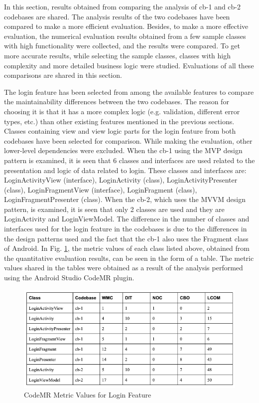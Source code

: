 In this section, results obtained from comparing the analysis of cb-1 and cb-2 codebases are shared. The analysis results of the two codebases have been compared to make a more efficient evaluation. Besides, to make a more effective evaluation, the numerical evaluation results obtained from a few sample classes with high functionality were collected, and the results were compared. To get more accurate results, while selecting the sample classes, classes with high complexity and more detailed business logic were studied. Evaluations of all these comparisons are shared in this section.

The login feature has been selected from among the available features to compare the maintainability differences between the two codebases. The reason for choosing it is that it has a more complex logic (e.g. validation, different error types, etc.) than other existing features mentioned in the previous sections. Classes containing view and view logic parts for the login feature from both codebases have been selected for comparison. While making the evaluation, other lower-level dependencies were excluded. When the cb-1 using the MVP design pattern is examined, it is seen that 6 classes and interfaces are used related to the presentation and logic of data related to login. These classes and interfaces are: LoginActivityView (interface), LoginActivity (class), LoginActivityPresenter (class), LoginFragmentView (interface), LoginFragment (class), LoginFragmentPresenter (class). When the cb-2, which uses the MVVM design pattern, is examined, it is seen that only 2 classes are used and they are LoginActivity and LoginViewModel. The difference in the number of classes and interfaces used for the login feature in the codebases is due to the differences in the design patterns used and the fact that the cb-1 also uses the Fragment class of Android. In Fig. \ref{fig:login-metric-table}, the metric values of each class listed above, obtained from the quantitative evaluation results, can be seen in the form of a table. The metric values shared in the tables were obtained as a result of the analysis performed using the Android Studio CodeMR plugin.
\begin{figure}[ht!]
    \centering
    \includegraphics[scale=0.65]{figures/login-metric-table.png}
    \caption{CodeMR Metric Values for Login Feature}
    \label{fig:login-metric-table}
\end{figure}
\FloatBarrier

